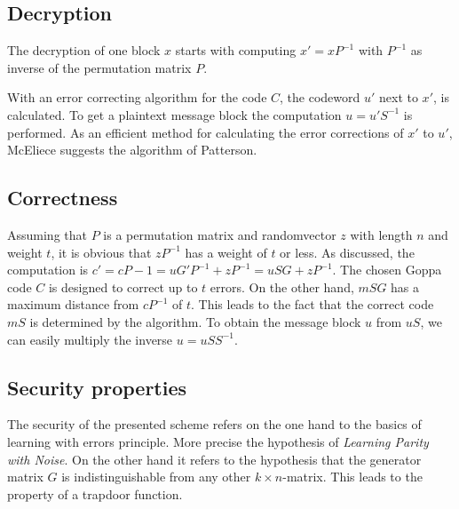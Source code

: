 \subsection*{Decryption}
The decryption of one block $x$ starts with computing $x' = xP^{-1}$ with $P^{-1}$ as inverse of the permutation matrix $P$. 

With an error correcting algorithm for the code $C$, the codeword $u'$ next to $x'$, is calculated. 
To get a plaintext message block the computation $u = u'S^{-1}$ is performed\cite{wiki:mcelice}\cite{mceliece1978public}.
As an efficient method for calculating the error corrections of $x'$ to $u'$, McEliece suggests the algorithm of Patterson\cite{patterson1975algebraic}. 


\subsection*{Correctness}
Assuming that $P$ is a permutation matrix and randomvector $z$ with length $n$ and weight $t$, it is obvious that $zP^{-1}$ has a weight of $t$ or less.
As discussed, the computation is $c' = c P - 1 = uG'P^{-1} + zP^{-1} = uSG + z P^{-1}$.
The chosen Goppa code $C$ is designed to correct up to $t$ errors. On the other hand, $mSG$ has a maximum distance from $cP^{-1}$ of $t$. This leads to the fact that the correct code $mS$ is determined by the algorithm. 
To obtain the message block $u$ from $uS$, we can easily multiply the inverse $u = uSS^{-1}$\cite{wiki:mcelice}.

\subsection*{Security properties}
The security of the presented scheme refers on the one hand to the basics of learning with errors principle. More precise the hypothesis of \textit{Learning Parity with Noise}\cite{pietrzak2012cryptography}. 
On the other hand it refers to the hypothesis that the generator matrix $G$ is indistinguishable from any other $k \times n$-matrix. This leads to the property of a trapdoor function.

